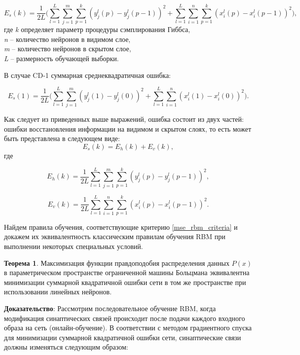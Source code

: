 \begin{equation*}	
    E_s(k)=\frac{1}{2L}\Bigg(\sum_{l=1}^L\sum_{j=1}^m\sum_{p=1}^k (y_j^l(p)-y_j^l(p-1))^2+\sum_{l=1}^L\sum_{i=1}^n\sum_{p=1}^k (x_i^l(p)-x_i^l(p-1))^2\Bigg),
\end{equation*}
где \textit{k} определяет параметр процедуры сэмплирования Гиббса,\\
\textit{n} -- количество нейронов в видимом слое,\\
\textit{m} -- количество нейронов в скрытом слое,\\
\textit{L} -- размерность обучающей выборки.

В случае CD-1  суммарная среднеквадратичная ошибка:

\begin{equation}
    E_s(1)=\frac{1}{2L}\Bigg(\sum_{l=1}^L\sum_{j=1}^m (y_j^l(1)-y_j^l(0))^2+\sum_{l=1}^L\sum_{i=1}^n (x_i^l(1)-x_i^l(0))^2\Bigg).
\end{equation}

Как следует из приведенных выше выражений, ошибка состоит из двух частей: ошибки восстановления информации на видимом и скрытом слоях, то есть может быть представлена в следующем виде:
\begin{equation}
	\label{mse_rbm_criteria}
	E_s(k) = E_h(k) + E_v(k),
\end{equation}
где

\begin{equation}
	E_h(k) = \frac{1}{2L}\sum_{l=1}^L\sum_{j=1}^m\sum_{p=1}^k (y_j^l(p)-y_j^l(p-1))^2,
\end{equation}

\begin{equation}
	E_v(k) = \frac{1}{2L}\sum_{l=1}^L\sum_{i=1}^n\sum_{p=1}^k (x_i^l(p)-x_i^l(p-1))^2.
\end{equation}

Найдем правила обучения, соответствующие критерию \ref{mse_rbm_criteria} и докажем их эквивалентность классическим правилам обучения RBM при выполнении некоторых специальных условий.

\textbf{Теорема 1}. Максимизация функции правдоподобия распределения данных $P(x)$ в параметрическом пространстве ограниченной машины Больцмана эквивалентна минимизации суммарной квадратичной ошибки сети в том же пространстве при использовании линейных нейронов.

\textbf{Доказательство}: Рассмотрим последовательное обучение RBM, когда модификация синаптических связей происходит после подачи каждого входного образа на сеть (онлайн-обучение). В соответствии с методом градиентного спуска для минимизации суммарной квадратичной ошибки сети, синаптические связи должны изменяться следующим образом:	

